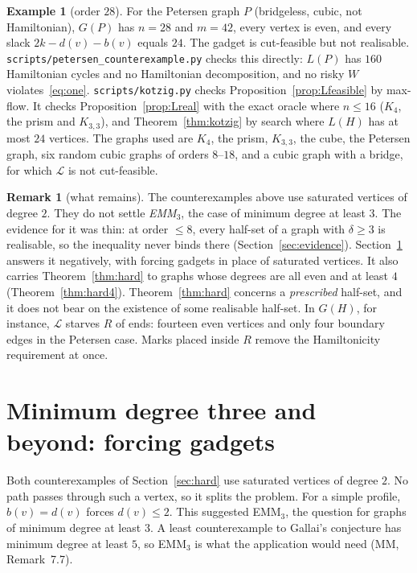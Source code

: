 \documentclass[11pt]{amsart}
\theoremstyle{definition}
\newtheorem{remark}[theorem]{Remark}
\newtheorem*{example*}{Example}
\begin{document}
\begin{example*}[order $28$]
For the Petersen graph $P$ (bridgeless, cubic, not Hamiltonian), $G(P)$ has $n=28$ and $m=42$, every
vertex is even, and every slack $2k-d(v)-b(v)$ equals $24$. The gadget is cut-feasible but not
realisable. \texttt{scripts/petersen\_counterexample.py} checks this directly: $L(P)$ has $160$
Hamiltonian cycles and no Hamiltonian decomposition, and no risky $W$ violates~\eqref{eq:one}.
\texttt{scripts/kotzig.py} checks Proposition~\ref{prop:Lfeasible} by max-flow. It checks
Proposition~\ref{prop:Lreal} with the exact oracle where $n\le16$ ($K_4$, the prism and $K_{3,3}$), and
Theorem~\ref{thm:kotzig} by search where $L(H)$ has at most $24$ vertices. The graphs
used are $K_4$, the prism, $K_{3,3}$, the cube, the Petersen graph, six random cubic graphs of orders
$8$--$18$, and a cubic graph with a bridge, for which $\mathcal L$ is not cut-feasible.
\end{example*}

\begin{remark}[what remains]\label{rem:what}
The counterexamples above use saturated vertices of degree $2$. They do not settle
\emph{EMM$_3$}, the case of minimum degree at least $3$. The evidence for it was thin: at order
$\le8$, every half-set of a graph with $\delta\ge3$ is realisable, so the inequality never binds
there (Section~\ref{sec:evidence}). Section~\ref{sec:gadgets} answers it negatively, with forcing
gadgets in place of saturated vertices. It also carries Theorem~\ref{thm:hard} to graphs whose
degrees are all even and at least $4$ (Theorem~\ref{thm:hard4}). Theorem~\ref{thm:hard}
concerns a \emph{prescribed} half-set, and it does not bear on the existence of some realisable
half-set. In $G(H)$, for instance, $\mathcal L$ starves $R$ of ends: fourteen even vertices and only
four boundary edges in the Petersen case. Marks placed inside $R$ remove the Hamiltonicity requirement
at once.
\end{remark}

\section{Minimum degree three and beyond: forcing gadgets}\label{sec:gadgets}

Both counterexamples of Section~\ref{sec:hard} use saturated vertices of degree $2$. No path
passes through such a vertex, so it splits the problem. For a simple profile, $b(v)=d(v)$ forces
$d(v)\le2$. This suggested EMM$_3$, the question for graphs of minimum degree at least $3$. A least
counterexample to Gallai's conjecture has minimum degree at least $5$, so EMM$_3$ is what the
application would need (MM, Remark~7.7).
\end{document}
